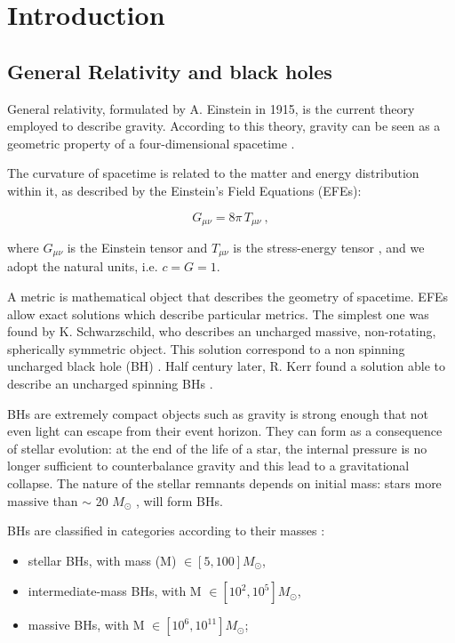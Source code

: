 \section{Introduction} 

\subsection{General Relativity and black holes}

General relativity, formulated by A. Einstein in 1915, is the current theory employed to describe gravity. According to this theory, gravity can be seen as a geometric property of a four-dimensional spacetime \cite{ferrari2020general}.

The curvature of spacetime is related to the matter and energy distribution within it, as described by the Einstein's Field Equations (EFEs):

\begin{equation}
G_{\mu\nu}={8\pi} \, T_{\mu\nu} \:,
\end{equation}

\noindent
where $G_{\mu\nu}$ is the Einstein tensor and $T_{\mu\nu}$ is the stress-energy tensor \cite{1916AnP...354..769E}, and we adopt the natural units, i.e. $ c=G=1$. 

A metric is mathematical object that describes the geometry of spacetime.
EFEs allow exact solutions which describe particular metrics. The simplest one was found by K. Schwarzschild, who describes an uncharged massive, non-rotating, spherically symmetric object. This solution correspond to a non spinning uncharged black hole (BH) \cite{1916SPAW.......189S}. Half century later, R. Kerr found a solution able to describe an uncharged spinning BHs \cite{1963PhRvL..11..237K}. 

BHs are extremely compact objects such as gravity is strong enough that not even light can escape from their event horizon.  
They can form as a consequence of stellar evolution: at the end of the life of a star, the internal pressure is no longer sufficient to counterbalance gravity and this lead to a gravitational collapse. The nature of the stellar remnants depends on initial mass: stars more massive than $\sim$ 20 $M _{\odot}$  \cite{1996A&A...305..871B}, will form BHs. 

BHs are classified in categories according to their masses \cite{article}:
\begin{itemize} 

\item stellar BHs, with  mass (M) $\in [5,100]  M _{\odot}$,
\item intermediate-mass BHs, with M $\in [10^2,10^5]  M _{\odot}$,
\item massive BHs, with M $\in [10^6,10^{11}]  M _{\odot}$;

\end{itemize}

